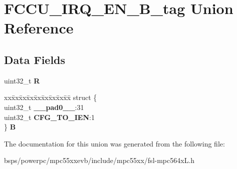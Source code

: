 \hypertarget{unionFCCU__IRQ__EN__32B__tag}{}\section{F\+C\+C\+U\+\_\+\+I\+R\+Q\+\_\+\+E\+N\+\_\+B\+\_\+tag Union Reference}
\label{unionFCCU__IRQ__EN__32B__tag}
\subsection*{Data Fields}
\begin{DoxyCompactItemize}
\item 
\mbox{\label{unionFCCU__IRQ__EN__32B__tag_aeb4fca02f43f5ca9b0e1eb36f167d842}} 
uint32\+\_\+t {\bfseries R}
\item 
\mbox{\label{unionFCCU__IRQ__EN__32B__tag_aa08b0a6a9407ab946aa52fbd5ec8a226}} 
\begin{tabbing}
xx\=xx\=xx\=xx\=xx\=xx\=xx\=xx\=xx\=\kill
struct \{\\
\>uint32\_t {\bfseries \_\_pad0\_\_}:31\\
\>uint32\_t {\bfseries CFG\_TO\_IEN}:1\\
\} {\bfseries B}\\

\end{tabbing}\end{DoxyCompactItemize}


The documentation for this union was generated from the following file\+:\begin{DoxyCompactItemize}
\item 
bsps/powerpc/mpc55xxevb/include/mpc55xx/fsl-\/mpc564x\+L.\+h\end{DoxyCompactItemize}
